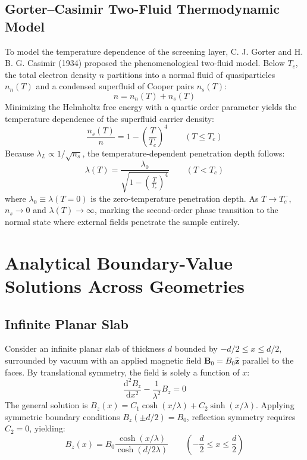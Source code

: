 \documentclass[11pt,a4paper]{article}
\begin{document}
\subsection{Gorter--Casimir Two-Fluid Thermodynamic Model}
To model the temperature dependence of the screening layer, C. J. Gorter and H. B. G. Casimir (1934) proposed the phenomenological two-fluid model. Below $T_c$, the total electron density $n$ partitions into a normal fluid of quasiparticles $n_n(T)$ and a condensed superfluid of Cooper pairs $n_s(T)$:
\begin{equation}
    n = n_n(T) + n_s(T)
\end{equation}
Minimizing the Helmholtz free energy with a quartic order parameter yields the temperature dependence of the superfluid carrier density:
\begin{equation}
    \frac{n_s(T)}{n} = 1 - \left(\frac{T}{T_c}\right)^4 \qquad (T \le T_c)
\end{equation}
Because $\lambda_L \propto 1/\sqrt{n_s}$, the temperature-dependent penetration depth follows:
\begin{equation}
    \lambda(T) = \frac{\lambda_0}{\sqrt{1 - \left(\frac{T}{T_c}\right)^4}} \qquad (T < T_c)
\end{equation}
where $\lambda_0 \equiv \lambda(T = 0)$ is the zero-temperature penetration depth. As $T \to T_c^-$, $n_s \to 0$ and $\lambda(T) \to \infty$, marking the second-order phase transition to the normal state where external fields penetrate the sample entirely.

\section{Analytical Boundary-Value Solutions Across Geometries}

\subsection{Infinite Planar Slab}
Consider an infinite planar slab of thickness $d$ bounded by $-d/2 \le x \le d/2$, surrounded by vacuum with an applied magnetic field $\mathbf{B}_0 = B_0 \hat{\mathbf{z}}$ parallel to the faces. By translational symmetry, the field is solely a function of $x$:
\begin{equation}
    \frac{\mathrm{d}^2 B_z}{\mathrm{d}x^2} - \frac{1}{\lambda^2} B_z = 0
\end{equation}
The general solution is $B_z(x) = C_1 \cosh(x/\lambda) + C_2 \sinh(x/\lambda)$. Applying symmetric boundary conditions $B_z(\pm d/2) = B_0$, reflection symmetry requires $C_2 = 0$, yielding:
\begin{equation}
    B_z(x) = B_0 \frac{\cosh(x / \lambda)}{\cosh(d / 2\lambda)} \qquad \left(-\frac{d}{2} \le x \le \frac{d}{2}\right)
\end{equation}
\end{document}
